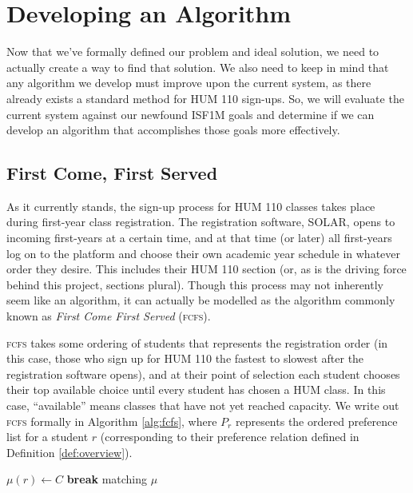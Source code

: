 \chapter{Developing an Algorithm}

Now that we've formally defined our problem and ideal solution, we need to
actually create a way to find that solution. We also need to keep in
mind that any algorithm we develop must improve upon the current system, as
there already exists a standard method for HUM 110 sign-ups. So, we will evaluate the current
system against our newfound ISF1M goals and determine if we can develop an
algorithm that accomplishes those goals more effectively.

\section{First Come, First Served}
As it currently stands, the sign-up process for HUM 110 classes takes place during
first-year class registration. The registration software, SOLAR, opens to incoming
first-years at a certain time, and at that time (or later) all first-years log on to
the platform and choose their own academic year schedule in whatever order they
desire. This includes their HUM 110 section (or, as is the driving force behind this
project, sections plural). Though this process may not inherently seem like an
algorithm, it can actually be modelled as the algorithm commonly known as
\textit{First Come First Served} (\textsc{fcfs}).

\textsc{fcfs} takes some ordering of students that represents the registration
order (in this case, those who sign up for HUM 110 the fastest to slowest after
the registration software opens), and at their point of
selection each student chooses their top available choice until every student
has chosen a HUM class. In this case, “available” means classes that have not
yet reached capacity. We write out \textsc{fcfs} formally in Algorithm
\ref{alg:fcfs}, where
$P_r$ represents the ordered preference list for a student $r$ (corresponding to
their preference relation defined in Definition \ref{def:overview}).

\begin{algorithm}
  \caption{First Come First Served}
  \label{alg:fcfs}
  \begin{algorithmic}[1]
     
    \State $\mu(r) \gets C$ 
    \State \textbf{break}   \EndIf \EndFor \EndFor
    \State \Return matching $\mu$

  \end{algorithmic}
\end{algorithm}

